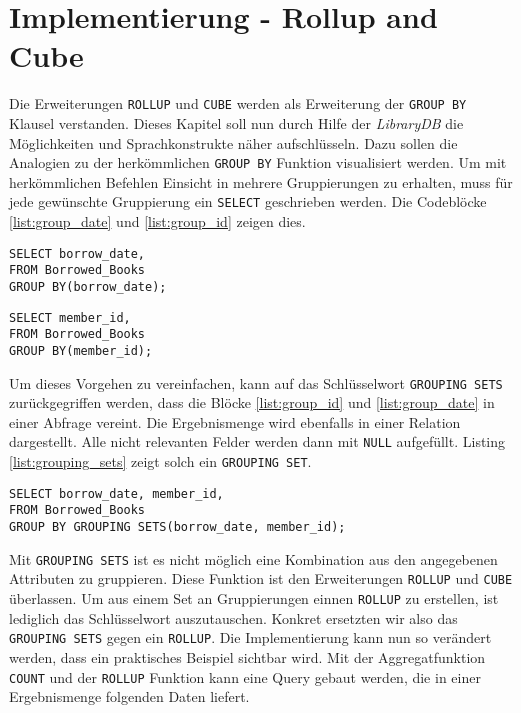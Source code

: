\section{Implementierung - Rollup and Cube}
\label{sec:implementierung_rollup_and_cube} Die Erweiterungen \texttt{ROLLUP} und
\texttt{CUBE} werden als Erweiterung der \texttt{GROUP BY} Klausel verstanden.
Dieses Kapitel soll nun durch Hilfe der \textit{LibraryDB} die Möglichkeiten und
Sprachkonstrukte näher aufschlüsseln. Dazu sollen die Analogien zu der
herkömmlichen \texttt{GROUP BY} Funktion visualisiert werden. Um mit
herkömmlichen Befehlen Einsicht in mehrere Gruppierungen zu erhalten, muss für jede
gewünschte Gruppierung ein \texttt{SELECT} geschrieben werden. Die Codeblöcke \ref{list:group_date}
und \ref{list:group_id} zeigen dies.

\begin{minipage}{0.45\textwidth}
	 \begin{lstlisting}
SELECT borrow_date,
FROM Borrowed_Books
GROUP BY(borrow_date);
	\end{lstlisting}
\end{minipage}
\hfill
\begin{minipage}{0.45\textwidth}
	 \begin{lstlisting}
SELECT member_id,
FROM Borrowed_Books
GROUP BY(member_id);
	\end{lstlisting}
\end{minipage}

Um dieses Vorgehen zu vereinfachen, kann auf das Schlüsselwort \texttt{GROUPING
SETS} zurückgegriffen werden, dass die Blöcke \ref{list:group_id} und \ref{list:group_date}
in einer Abfrage vereint. Die Ergebnismenge wird ebenfalls in einer Relation
dargestellt. Alle nicht relevanten Felder werden dann mit \texttt{NULL}
aufgefüllt. Listing \ref{list:grouping_sets} zeigt solch ein \texttt{GROUPING SET}.

\begin{lstlisting}[caption={Beispiel eines \texttt{GROUPING SETS}}, label={list:grouping_sets}]
SELECT borrow_date, member_id,
FROM Borrowed_Books
GROUP BY GROUPING SETS(borrow_date, member_id);
\end{lstlisting}

Mit \texttt{GROUPING SETS} ist es nicht möglich eine Kombination aus den
angegebenen Attributen zu gruppieren. Diese Funktion ist den Erweiterungen \texttt{ROLLUP}
und \texttt{CUBE} überlassen. Um aus einem Set an Gruppierungen einnen \texttt{ROLLUP}
zu erstellen, ist lediglich das Schlüsselwort auszutauschen. Konkret ersetzten wir
also das \texttt{GROUPING SETS} gegen ein \texttt{ROLLUP}. Die Implementierung
kann nun so verändert werden, dass ein praktisches Beispiel sichtbar wird. Mit
der Aggregatfunktion \texttt{COUNT} und der \texttt{ROLLUP} Funktion kann eine
Query gebaut werden, die in einer Ergebnismenge folgenden Daten liefert.

